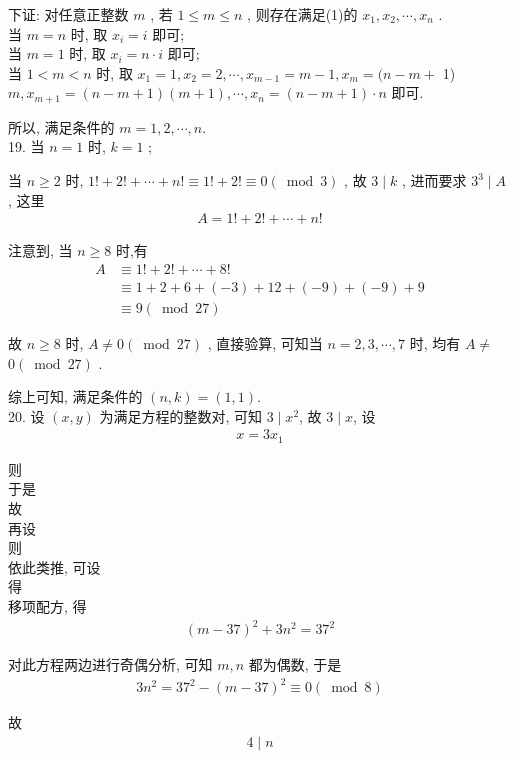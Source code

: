 下证: 对任意正整数 $m$ , 若 $1 \leqslant m \leqslant n$ , 则存在满足(1)的 $x_{1}, x_{2}, \cdots, x_{n}$ . \\
当 $m=n$ 时, 取 $x_{i}=i$ 即可; \\
当 $m=1$ 时, 取 $x_{i}=n \cdot i$ 即可;\\
当 $1<m<n$ 时, 取 $x_{1}=1, x_{2}=2, \cdots, x_{m-1}=m-1, x_{m}=(n-m+$ 1) $m, x_{m+1}=(n-m+1)(m+1), \cdots, x_{n}=(n-m+1) \cdot n$ 即可.

所以, 满足条件的 $m=1,2, \cdots, n$.\\
19. 当 $n=1$ 时,  $k=1$ ;

当 $n \geqslant 2$ 时, $1!+2!+\cdots+n!\equiv 1!+2!\equiv 0(\bmod 3)$ , 故 $3 \mid k$ , 进而要求 $3^{3} \mid A$ , 这里
\begin{align*}
	A=1!+2!+\cdots+n!
\end{align*}

注意到, 当 $n \geqslant 8$ 时,有\begin{align}
	A & \equiv 1!+2!+\cdots+8!           \\
	  & \equiv 1+2+6+(-3)+12+(-9)+(-9)+9 \\
	  & \equiv 9(\bmod 27)
\end{align}

故 $n \geqslant 8$ 时,  $A \neq 0(\bmod 27)$ , 直接验算, 可知当 $n=2,3, \cdots, 7$ 时, 均有 $A \neq$ $0(\bmod 27)$ .

综上可知, 满足条件的 $(n, k)=(1,1)$.\\
20. 设 $(x, y)$ 为满足方程的整数对, 可知 $3 \mid x^{2}$, 故 $3 \mid x$, 设
\begin{align*}
	x=3 x_{1}
\end{align*}

则\\
于是\\
故\\
再设\\
则\\
依此类推, 可设\\
得\\
移项配方, 得
\begin{align*}
	(m-37)^{2}+3 n^{2}=37^{2}
\end{align*}

对此方程两边进行奇偶分析, 可知 $m ,  n$ 都为偶数, 于是
\begin{align*}
	3 n^{2}=37^{2}-(m-37)^{2} \equiv 0(\bmod 8)
\end{align*}

故
\begin{align*}
	4 \mid n
\end{align*}

